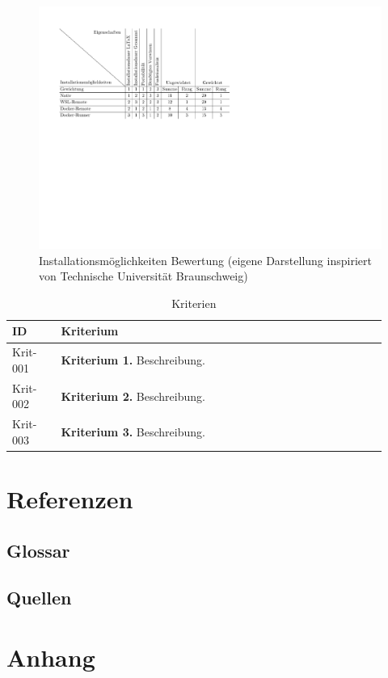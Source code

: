 \documentclass{article}
\begin{document}
\begin{figure}[ht!]
  \includegraphics[width=\textwidth]{installoptions_grading.pdf}
  \caption{Installationsmöglichkeiten Bewertung (eigene Darstellung inspiriert von Technische Universität Braunschweig)\cite{noauthor_gewichtete_nodate}}
  \label{fig:installoptions_grading}
\end{figure}

\begin{table}
  \centering
  \begin{tabular}{p{0.12\linewidth}|p{0.8\linewidth}}
    ID       & Kriterium                           \\
    \hline
    Krit-001 & \textbf{Kriterium 1.} Beschreibung. \\
    \hline
    Krit-002 & \textbf{Kriterium 2.} Beschreibung. \\
    \hline
    Krit-003 & \textbf{Kriterium 3.} Beschreibung. \\
  \end{tabular}
  \caption{Kriterien}
  \label{tbl:krit}
\end{table}

\clearpage
\section{Referenzen}
\subsection{Glossar}
\printnoidxglossary[title=\large Wörter]
\printnoidxglossary[type=\acronymtype,title=\large Akronyme]

\subsection{Quellen}
\printbibliography[heading=none]

\listoffigures

\listoftables

\section{Anhang}
\end{document}
